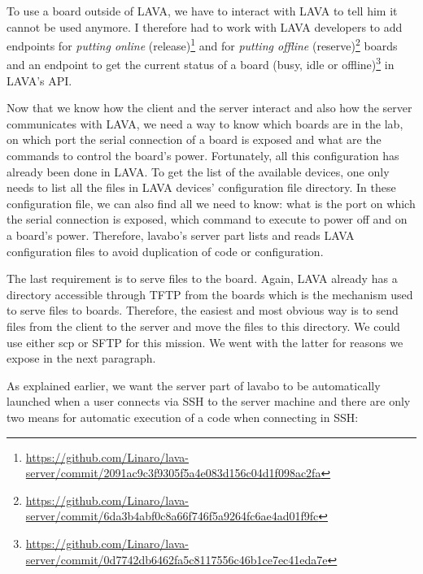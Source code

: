 To use a board outside of LAVA, we have to interact with LAVA to tell him it cannot be used anymore. I therefore had to work with LAVA developers to add endpoints for \textit{putting online} (release)\footnote{\url{https://github.com/Linaro/lava-server/commit/2091ac9c3f9305f5a4e083d156c04d1f098ac2fa}} and for \textit{putting offline} (reserve)\footnote{\url{https://github.com/Linaro/lava-server/commit/6da3b4abf0c8a66f746f5a9264fc6ae4ad01f9fc}} boards and an endpoint to get the current status of a board (busy, idle or offline)\footnote{\url{https://github.com/Linaro/lava-server/commit/0d7742db6462fa5c8117556c46b1ce7ec41eda7e}} in LAVA's API.

Now that we know how the client and the server interact and also how the server communicates with LAVA, we need a way to know which boards are in the lab, on which port the serial connection of a board is exposed and what are the commands to control the board's power. Fortunately, all this configuration has already been done in LAVA. To get the list of the available devices, one only needs to list all the files in LAVA devices' configuration file directory. In these configuration file, we can also find all we need to know: what is the port on which the serial connection is exposed, which command to execute to power off and on a board's power. Therefore, lavabo's server part lists and reads LAVA configuration files to avoid duplication of code or configuration.

The last requirement is to serve files to the board. Again, LAVA already has a directory accessible through TFTP from the boards which is the mechanism used to serve files to boards. Therefore, the easiest and most obvious way is to send files from the client to the server and move the files to this directory. We could use either scp or SFTP for this mission. We went with the latter for reasons we expose in the next paragraph.

As explained earlier, we want the server part of lavabo to be automatically launched when a user connects via SSH to the server machine and there are only two means for automatic execution of a code when connecting in SSH:

